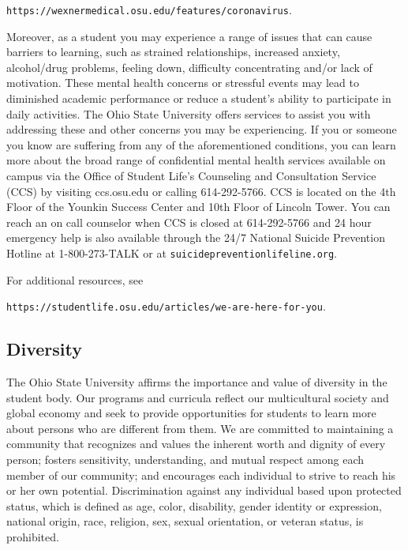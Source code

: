 \documentclass[12pt]{amsart}
\begin{document}
\noindent
\texttt{https://wexnermedical.osu.edu/features/coronavirus}.

Moreover, as a student you may experience a range of issues that can
cause barriers to learning, such as strained relationships, increased
anxiety, alcohol/drug problems, feeling down, difficulty concentrating
and/or lack of motivation. These mental health concerns or stressful
events may lead to diminished academic performance or reduce a
student's ability to participate in daily activities. The Ohio State
University offers services to assist you with addressing these and
other concerns you may be experiencing. If you or someone you know are
suffering from any of the aforementioned conditions, you can learn
more about the broad range of confidential mental health services
available on campus via the Office of Student Life's Counseling and
Consultation Service (CCS) by visiting ccs.osu.edu or calling
614-292-5766. CCS is located on the 4th Floor of the Younkin Success
Center and 10th Floor of Lincoln Tower. You can reach an on call
counselor when CCS is closed at 614-292-5766 and 24 hour emergency
help is also available through the 24/7 National Suicide Prevention
Hotline at 1-800-273-TALK or at \texttt{suicidepreventionlifeline.org}.

For additional resources, see

\noindent
\texttt{https://studentlife.osu.edu/articles/we-are-here-for-you}.

\subsection*{Diversity}
The Ohio State University affirms the importance and value of
diversity in the student body. Our programs and curricula reflect our
multicultural society and global economy and seek to provide
opportunities for students to learn more about persons who are
different from them. We are committed to maintaining a community that
recognizes and values the inherent worth and dignity of every person;
fosters sensitivity, understanding, and mutual respect among each
member of our community; and encourages each individual to strive to
reach his or her own potential. Discrimination against any individual
based upon protected status, which is defined as age, color,
disability, gender identity or expression, national origin, race,
religion, sex, sexual orientation, or veteran status, is prohibited.

\end{document}
